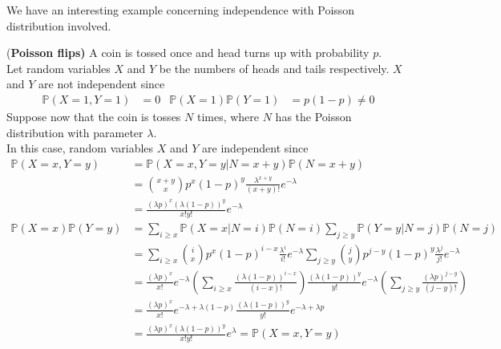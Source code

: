 \documentclass{huhtakm-template-book}
\newcommand{\prob}{\mathbb{P}}
\begin{document}
    We have an interesting example concerning independence with Poisson distribution involved.
    \begin{eg}(\textbf{Poisson flips)}
        A coin is tossed once and head turns up with probability $p$.\\
        Let random variables $X$ and $Y$ be the numbers of heads and tails respectively. $X$ and $Y$ are not independent since
        \begin{align*}
            \prob(X=1,Y=1)&=0 & \prob(X=1)\prob(Y=1)&=p(1-p)\neq 0
        \end{align*}
        Suppose now that the coin is tosses $N$ times, where $N$ has the Poisson distribution with parameter $\lambda$.\\
        In this case, random variables $X$ and $Y$ are independent since
        \begin{align*}
            \prob(X=x,Y=y)&=\prob(X=x,Y=y|N=x+y)\prob(N=x+y)\\
            &=\binom{x+y}{x}p^{x}(1-p)^{y}\frac{\lambda^{x+y}}{(x+y)!}e^{-\lambda}\\
            &=\frac{(\lambda p)^{x}(\lambda(1-p))^{y}}{x!y!}e^{-\lambda}\\
            \prob(X=x)\prob(Y=y)&=\sum_{i\geq x}\prob(X=x|N=i)\prob(N=i)\sum_{j\geq y}\prob(Y=y|N=j)\prob(N=j)\\
            &=\sum_{i\geq x}\binom{i}{x}p^{x}(1-p)^{i-x}\frac{\lambda^{i}}{i!}e^{-\lambda}\sum_{j\geq y}\binom{j}{y}p^{j-y}(1-p)^{y}\frac{\lambda^{j}}{j!}e^{-\lambda}\\
            &=\frac{(\lambda p)^{x}}{x!}e^{-\lambda}\left(\sum_{i\geq x}\frac{(\lambda(1-p))^{i-x}}{(i-x)!}\right)\frac{(\lambda(1-p))^{y}}{y!}e^{-\lambda}\left(\sum_{j\geq y}\frac{(\lambda p)^{j-y}}{(j-y)!}\right)\\
            &=\frac{(\lambda p)^{x}}{x!}e^{-\lambda+\lambda(1-p)}\frac{(\lambda(1-p))^{y}}{y!}e^{-\lambda+\lambda p}\\
            &=\frac{(\lambda p)^{x}(\lambda(1-p))^{y}}{x!y!}e^{\lambda}=\prob(X=x,Y=y)
        \end{align*}
    \end{eg}
    
\end{document}
